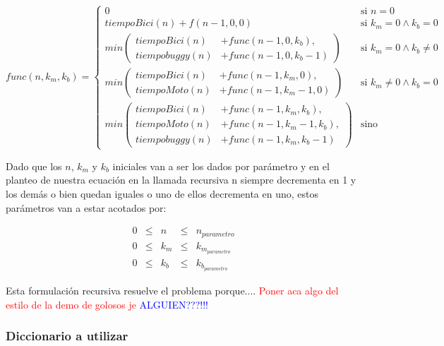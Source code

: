 \begin{equation*}
func(n, k_m, k_b) = 
\begin{cases} 
       0  & \mbox{si } n = 0  \\[2ex]
       tiempoBici(n) + f(n-1, 0, 0)  & \mbox{si } k_m=0 \wedge k_b=0 \\[2ex]
      min \left(
      \begin{split}
       tiempoBici(n) & + func(n-1, 0, k_b) , \\
       tiempobuggy(n) & + func(n-1, 0, k_b-1)
\end{split} \right) & \mbox{si } k_m=0 \wedge k_b\neq0 \\[3ex]
      min \left(
      \begin{split}
       tiempoBici(n) & + func(n-1, k_m, 0) , \\
       tiempoMoto(n) & + func(n-1, k_m-1, 0)
\end{split} \right) & \mbox{si } k_m\neq0 \wedge k_b=0 \\[3ex]
           min \left(
      \begin{split}
       tiempoBici(n) & + func(n-1, k_m, k_b) , \\
       tiempoMoto(n) & + func(n-1, k_m-1, k_b) , \\
       tiempobuggy(n) & + func(n-1, k_m, k_b-1)
\end{split} \right) & \mbox{sino}
\end{cases} 
\end{equation*}

Dado que los $n$, $k_m$ y $k_b$ iniciales van a ser los dados por par\'ametro y en el planteo de nuestra ecuaci\'on en la llamada recursiva n siempre decrementa en 1 y los dem\'as o bien quedan iguales o uno de ellos decrementa en uno, estos par\'ametros van a estar acotados por:

\begin{equation*}
\begin{array}{lllll}
0 & \leq & n &\leq & n_{parametro} \\
0 & \leq & k_m & \leq & k_{m_{parametro}} \\
0 & \leq & k_b & \leq & k_{b_{parametro}}
\end{array}
\end{equation*}

\newpage
Esta formulaci\'on recursiva resuelve el problema porque.... \textcolor{red}{Poner aca algo del estilo de la demo de golosos je} \textcolor{blue}{ALGUIEN???!!!}

\subsubsection*{Diccionario a utilizar}

